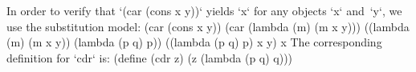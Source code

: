 In order to verify that `(car (cons x y))` yields `x` for any objects `x` and~`y`, we use the substitution model:
\begtt\scm
(car (cons x y))
(car (lambda (m) (m x y)))
((lambda (m) (m x y)) (lambda (p q) p))
((lambda (p q) p) x y)
x
\endtt
The corresponding definition for `cdr` is:
\begtt\scm
(define (cdr z)
  (z (lambda (p q) q)))
\endtt
